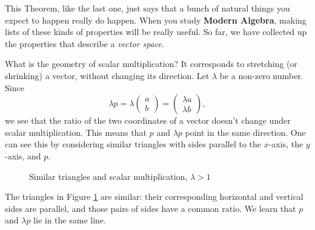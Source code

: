\documentclass[00-livre-main.tex]{subfiles}
\begin{document}
This Theorem, like the last one, just says that a bunch of natural things you expect to happen really do happen. When you study \textbf{Modern Algebra}, making lists of these kinds of properties will be really useful. So far, we have collected up the properties that describe a \emph{vector space}.


What is the geometry of scalar multiplication?
It corresponds to stretching (or shrinking) a vector, without changing its direction.
Let $\lambda$ be a non-zero number. Since
\[
\lambda p = \lambda \begin{pmatrix} a \\ b \end{pmatrix} = \begin{pmatrix} \lambda a \\ \lambda b\end{pmatrix},
\]
we see that the ratio of the two coordinates of a vector doesn't change under scalar multiplication. This means that $p$ and $\lambda p$ point in the same direction.
One can see this by considering similar triangles with sides parallel to the $x$-axis, the $y$-axis, and $p$.

\begin{figure}[h!]
\centering
{}
\caption{Similar triangles and scalar multiplication, $\lambda >1$}
\label{fig:sim-tri}
\end{figure}

The triangles in Figure \ref{fig:sim-tri} are similar: their corresponding horizontal and vertical sides are parallel, and those pairs of sides have a common ratio.
We learn that $p$ and $\lambda p$ lie in the same line.
\end{document}
